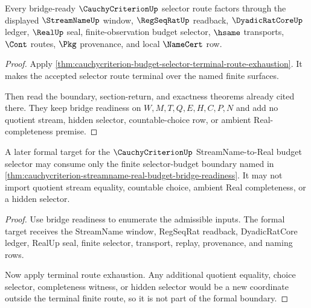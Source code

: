 \begin{theorem}
\label{thm:cauchycriterion-streamname-real-budget-bridge-readiness}
Every bridge-ready $\CauchyCriterionUp$ selector route factors through the displayed $\StreamNameUp$ window, $\RegSeqRatUp$ readback, $\DyadicRatCoreUp$ ledger, $\RealUp$ seal, finite-observation budget selector, $\hsame$ transports, $\Cont$ routes, $\Pkg$ provenance, and local $\NameCert$ row.
\end{theorem}
\begin{proof}
Apply \autoref{thm:cauchycriterion-budget-selector-terminal-route-exhaustion}. It makes the accepted selector route terminal over the named finite surfaces.

Then read the boundary, section-return, and exactness theorems already cited there. They keep bridge readiness on $W,M,T,Q,E,H,C,P,N$ and add no quotient stream, hidden selector, countable-choice row, or ambient Real-completeness premise.
\end{proof}

\begin{theorem}
\label{thm:cauchycriterion-selector-budget-formal-target-boundary}
A later formal target for the $\CauchyCriterionUp$ StreamName-to-Real budget selector may consume only the finite selector-budget boundary named in \autoref{thm:cauchycriterion-streamname-real-budget-bridge-readiness}. It may not import quotient stream equality, countable choice, ambient Real completeness, or a hidden selector.
\end{theorem}
\begin{proof}
Use bridge readiness to enumerate the admissible inputs. The formal target receives the StreamName window, RegSeqRat readback, DyadicRatCore ledger, RealUp seal, finite selector, transport, replay, provenance, and naming rows.

Now apply terminal route exhaustion. Any additional quotient equality, choice selector, completeness witness, or hidden selector would be a new coordinate outside the terminal finite route, so it is not part of the formal boundary.
\end{proof}
